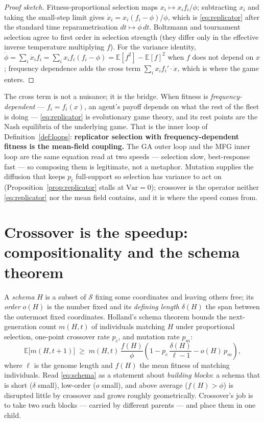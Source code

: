 \documentclass[11pt]{article}
\newcommand{\E}{\mathbb{E}}
\begin{document}
\begin{proof}[Proof sketch]
Fitness-proportional selection maps $x_i \mapsto x_i f_i/\phi$; subtracting $x_i$ and taking the small-step
limit gives $\dot x_i = x_i(f_i-\phi)/\phi$, which is \eqref{eq:replicator} after the standard time
reparametrisation $dt \mapsto \phi\,dt$. Boltzmann and tournament selection agree to first order in selection
strength (they differ only in the effective inverse temperature multiplying $f$). For the variance identity,
$\dot\phi=\sum_i \dot x_i f_i = \sum_i x_i f_i (f_i-\phi) = \E[f^2]-\E[f]^2$ when $f$ does not depend on $x$;
frequency dependence adds the cross term $\sum_i x_i f_i'\!\cdot\!\dot x$, which is where the game enters.
\end{proof}

The cross term is not a nuisance; it is the bridge. When fitness is \emph{frequency-dependent} ---
$f_i=f_i(x)$, an agent's payoff depends on what the rest of the fleet is doing --- \eqref{eq:replicator} is
evolutionary game theory, and its rest points are the Nash equilibria of the underlying game. That is the
inner loop of Definition~\ref{def:loops}: \textbf{replicator selection with frequency-dependent fitness is the
mean-field coupling.} The GA outer loop and the MFG inner loop are the same equation read at two speeds ---
selection slow, best-response fast --- so composing them is legitimate, not a metaphor. Mutation supplies the
diffusion that keeps $p_t$ full-support so selection has variance to act on (Proposition~\ref{prop:replicator}
stalls at $\mathrm{Var}=0$); crossover is the operator neither \eqref{eq:replicator} nor the mean field
contains, and it is where the speed comes from.

\section{Crossover is the speedup: compositionality and the schema theorem}
\label{sec:crossover}

A \emph{schema} $H$ is a subset of $\mathcal{S}$ fixing some coordinates and leaving others free; its
\emph{order} $o(H)$ is the number fixed and its \emph{defining length} $\delta(H)$ the span between the
outermost fixed coordinates. Holland's schema theorem \cite{holland1975} bounds the next-generation count $m(H,t)$ of individuals
matching $H$ under proportional selection, one-point crossover rate $p_c$, and mutation rate $p_m$:
\begin{equation}
\E\bigl[m(H,t+1)\bigr] \;\ge\; m(H,t)\,\frac{f(H)}{\phi}
\left(1 - p_c\,\frac{\delta(H)}{\ell-1} - o(H)\,p_m\right),
\label{eq:schema}
\end{equation}
where $\ell$ is the genome length and $f(H)$ the mean fitness of matching individuals. Read
\eqref{eq:schema} as a statement about \emph{building blocks}: a schema that is short ($\delta$ small),
low-order ($o$ small), and above average ($f(H)>\phi$) is disrupted little by crossover and grows roughly
geometrically. Crossover's job is to take two such blocks --- carried by different parents --- and place them
in one child.
\end{document}
